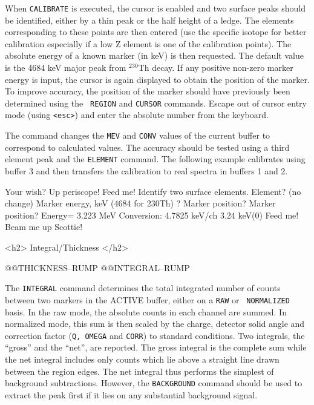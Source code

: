 {{{{{When {\tt CALIBRATE} is executed, the cursor is enabled and two surface peaks
should be identified, either by a thin peak or the half height of a ledge. The
elements corresponding to these points are then entered (use the specific
isotope for better calibration especially if a low Z element is one of the
calibration points).  The absolute energy of a known marker (in keV) is then
requested.  The default value is the 4684 keV major peak from $^{230}$Th
decay.  If any positive non-zero marker energy is input, the cursor is again
displayed to obtain the position of the marker.  To improve accuracy, the
position of the marker should have previously been determined using the {\tt
REGION} and {\tt CURSOR} commands.  Escape out of cursor entry mode (using
{\tt <esc>}) and enter the absolute number from the keyboard.

The command changes the {\tt MEV} and {\tt CONV} values of the current buffer
to correspond to calculated values.  The accuracy should be tested using a
third element peak and the {\tt ELEMENT} command.  The following example
calibrates using buffer 3 and then transfers the calibration to real spectra
in buffers 1 and 2.

\medskip\beginscreen
Your wish?     
Up periscope!  
Feed me!       
Identify two surface elements.
Element? (no change) 
Marker energy, keV (4684 for 230Th) ? 
Marker position? 
Marker position? 
 Energy= 3.223 MeV    Conversion:   4.7825 keV/ch     3.24 keV(0)
Feed me! 
Beam me up Scottie! 
\endscreen

<h2> Integral/Thickness </h2>


@@{THICKNESS--RUMP} @@{INTEGRAL--RUMP}

The {\tt INTEGRAL} command determines the total integrated number of counts
between two markers in the ACTIVE buffer, either on a {\tt RAW} or {\tt
NORMALIZED} basis.  In the raw mode, the absolute counts in each channel are
summed.  In normalized mode, this sum is then scaled by the charge, detector
solid angle and correction factor ({\tt Q, OMEGA} and {\tt CORR}) to standard
conditions.  Two integrals, the ``gross'' and the ``net'', are reported. 
The gross integral is the complete sum while the net integral includes only
counts which lie above a straight line drawn between the region edges.   The
net integral thus performs the simplest of background subtractions.  However,
the {\tt BACKGROUND} command should be used to extract the peak first if it
lies on any substantial background signal.  

}}}}}
